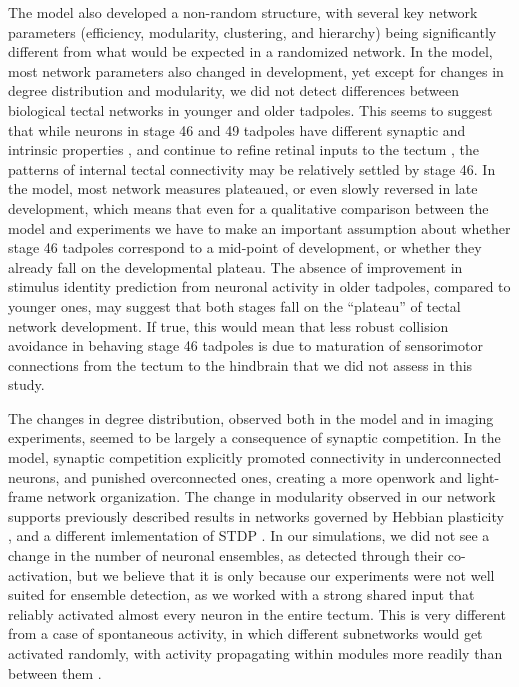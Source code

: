 \documentclass{article}
\begin{document}
The model also developed a non-random structure, with several key network parameters (efficiency, modularity, clustering, and hierarchy) being significantly different from what would be expected in a randomized network. In the model, most network parameters also changed in development, yet except for changes in degree distribution and modularity, we did not detect differences between biological tectal networks in younger and older tadpoles. This seems to suggest that while neurons in stage 46 and 49 tadpoles have different synaptic and intrinsic properties \citep{ciarleglio2015}, and continue to refine retinal inputs to the tectum \citep{tao2005refinement,munz2014hebbian}, the patterns of internal tectal connectivity may be relatively settled by stage 46. In the model, most network measures plateaued, or even slowly reversed in late development, which means that even for a qualitative comparison between the model and experiments we have to make an important assumption about whether stage 46 tadpoles correspond to a mid-point of development, or whether they already fall on the developmental plateau. The absence of improvement in stimulus identity prediction from neuronal activity in older tadpoles, compared to younger ones, may suggest that both stages fall on the “plateau” of tectal network development. If true, this would mean that less robust collision avoidance in behaving stage 46 tadpoles \citep{dong2009} is due to maturation of sensorimotor connections from the tectum to the hindbrain that we did not assess in this study.

The changes in degree distribution, observed both in the model and in imaging experiments, seemed to be largely a consequence of synaptic competition. In the model, synaptic competition explicitly promoted connectivity in underconnected neurons, and punished overconnected ones, creating a more openwork and light-frame network organization. The change in modularity observed in our network supports previously described results in networks governed by Hebbian plasticity \citep{triplett2018emergence,damicelli2018topomod}, and a different imlementation of STDP \citep{stam2010modular}. In our simulations, we did not see a change in the number of neuronal ensembles, as detected through their co-activation, but we believe that it is only because our experiments were not well suited for ensemble detection, as we worked with a strong shared input that reliably activated almost every neuron in the entire tectum. This is very different from a case of spontaneous activity, in which different subnetworks would get activated randomly, with activity propagating within modules more readily than between them \citep{avitan2017spontaneous}.
\end{document}
